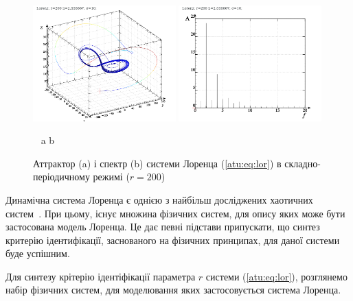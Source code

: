 \begin{figure}[ht!]
\begin{center}
  \includegraphics[width=0.49\textwidth]{p/cha/lor/lor0-p_xyz_r=200.png}
  \hfill
  \includegraphics[width=0.49\textwidth]{p/cha/lor/lor0_fft-p_f_r=200.png}
\end{center}
  \vspace{-1.0ex}
  \begin{center}
    ~ \hfill a \hfill\hfill b \hfill ~
  \end{center}
  \vspace{-1.5ex}
  \caption{Аттрактор (a) і спектр (b) системи Лоренца (\ref{atu:eq:lor}) в складно-періодичному режимі ($r = 200$)}
\label{atu:f:lor_attractor_phase_200}
\end{figure}



Динамічна система Лоренца є однією з найбільш досліджених
хаотичних систем~\cite{neimark_stoch_chaos_vibro}. При цьому, існує множина
фізичних систем, для опису яких може бути застосована модель
Лоренца. Це дає певні підстави припускати, що синтез критерію
ідентифікації, заснованого на фізичних принципах, для даної
системи буде успішним.


Для синтезу крітерію ідентіфікації параметра
$ r $ системи (\ref{atu:eq:lor}), розглянемо набір фізичних систем, для
моделювання яких застосовується система Лоренца.

